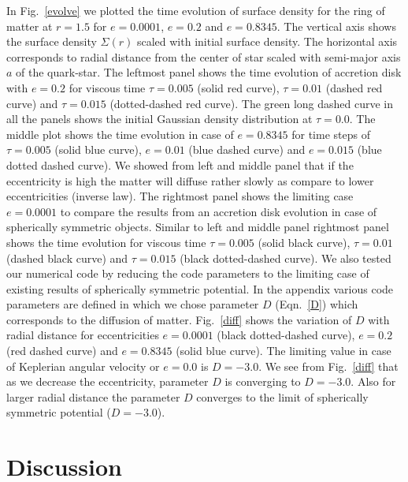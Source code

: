 \documentclass[useAMS,usenatbib]{mn2e}
\begin{document}
In Fig.~\ref{evolve} we plotted the time evolution of surface density for the ring of matter at $r = 1.5$ for $e = 0.0001$, $e = 0.2$ and $e = 0.8345$. The vertical axis shows the surface density $\Sigma(r)$ scaled with initial surface density. The horizontal axis corresponds to radial distance from the center of star scaled with semi-major axis $a$ of the quark-star. The leftmost panel shows the time evolution of accretion disk with $e = 0.2$ for viscous time $\tau = 0.005$ (solid red curve), $\tau = 0.01$ (dashed red curve) and $\tau = 0.015$ (dotted-dashed red curve). The green long dashed curve in all the panels shows the initial Gaussian density distribution at $\tau = 0.0$. The middle plot shows the time evolution in case of $e = 0.8345$ for time steps of $\tau = 0.005$ (solid blue curve), $e = 0.01$ (blue dashed curve) and $e = 0.015$ (blue dotted dashed curve). We showed from left and middle panel that if the eccentricity is high the matter will diffuse rather slowly as compare to lower eccentricities (inverse law). The rightmost panel shows the limiting case $e = 0.0001$ to compare the results from an accretion disk evolution in case of spherically symmetric objects. Similar to left and middle panel rightmost panel shows the time evolution for viscous time $\tau = 0.005$ (solid black curve), $\tau = 0.01$ (dashed black curve) and $\tau = 0.015$ (black dotted-dashed curve). We also tested our numerical code by reducing the code parameters to the limiting case of existing results of spherically symmetric potential. In the appendix various code parameters are defined in which we chose parameter $D$ (Eqn.~\ref{D}) which corresponds to the diffusion of matter. Fig.~\ref{diff} shows the variation of $D$ with radial distance for eccentricities $e = 0.0001$ (black dotted-dashed curve), $e = 0.2$ (red dashed curve) and $e = 0.8345$ (solid blue curve). The limiting value in case of Keplerian angular velocity or $e = 0.0$ is $D = -3.0$. We see from Fig.~\ref{diff} that as we decrease the eccentricity, parameter $D$ is converging to $D = -3.0$. Also for larger radial distance the parameter $D$ converges to the limit of spherically symmetric potential ($D = -3.0$).
\section{Discussion}
\end{document}
